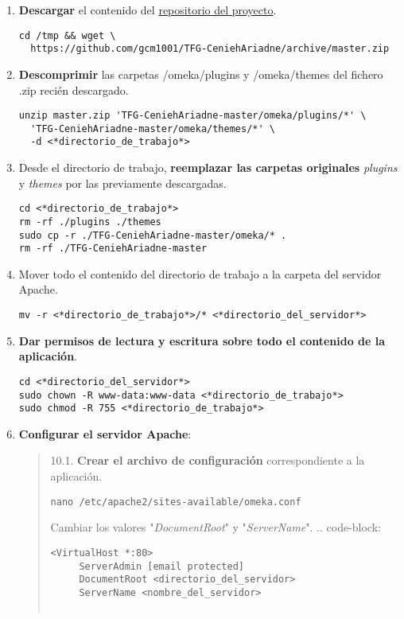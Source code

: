 \begin{enumerate}
\begin{verbatim}
cd <directorio_de_trabajo>
nano db.ini
\end{verbatim}
  No es necesario modificar los parámetros `prefix` o `port`.
\begin{verbatim}
[database]
host     = "localhost"
username = "usuario"
password = "contraseña"
dbname   = "omekadb"
prefix   = "omeka_"
charset  = "utf8"
;port     = ""
\end{verbatim}
\item
  \textbf{Descargar} el contenido del
  \href{https://github.com/gcm1001/TFG-CeniehAriadne}{repositorio del
  proyecto}.
\begin{verbatim}
cd /tmp && wget \
  https://github.com/gcm1001/TFG-CeniehAriadne/archive/master.zip
\end{verbatim}
\item
  \textbf{Descomprimir} las carpetas {/omeka/plugins} y {/omeka/themes}
  del fichero {.zip} recién descargado.
\begin{verbatim}
unzip master.zip 'TFG-CeniehAriadne-master/omeka/plugins/*' \
  'TFG-CeniehAriadne-master/omeka/themes/*' \
  -d <*directorio_de_trabajo*>
\end{verbatim}
\item
  Desde el directorio de trabajo, \textbf{reemplazar las carpetas
  originales} \emph{plugins} y \emph{themes} por las previamente
  descargadas.
\begin{verbatim}
cd <*directorio_de_trabajo*>
rm -rf ./plugins ./themes
sudo cp -r ./TFG-CeniehAriadne-master/omeka/* .
rm -rf ./TFG-CeniehAriadne-master
\end{verbatim}
\item
  Mover todo el contenido del directorio de trabajo a la carpeta del
  servidor Apache.
\begin{verbatim}
mv -r <*directorio_de_trabajo*>/* <*directorio_del_servidor*>
\end{verbatim}
\item
  \textbf{Dar permisos de lectura y escritura sobre todo el contenido de
  la aplicación}.
\begin{verbatim}
cd <*directorio_del_servidor*>
sudo chown -R www-data:www-data <*directorio_de_trabajo*>
sudo chmod -R 755 <*directorio_de_trabajo*>
\end{verbatim}
\item
  \textbf{Configurar el servidor Apache}:
\begin{quote}
10.1. \textbf{Crear el archivo de configuración} correspondiente a la
aplicación.
\begin{verbatim}
nano /etc/apache2/sites-available/omeka.conf
\end{verbatim}
Cambiar los valores "\emph{DocumentRoot}" y "\emph{ServerName}". ..
code-block:
\begin{verbatim}
<VirtualHost *:80>
     ServerAdmin [email protected]
     DocumentRoot <directorio_del_servidor>
     ServerName <nombre_del_servidor>


\end{verbatim}
\end{quote}
\end{enumerate}
